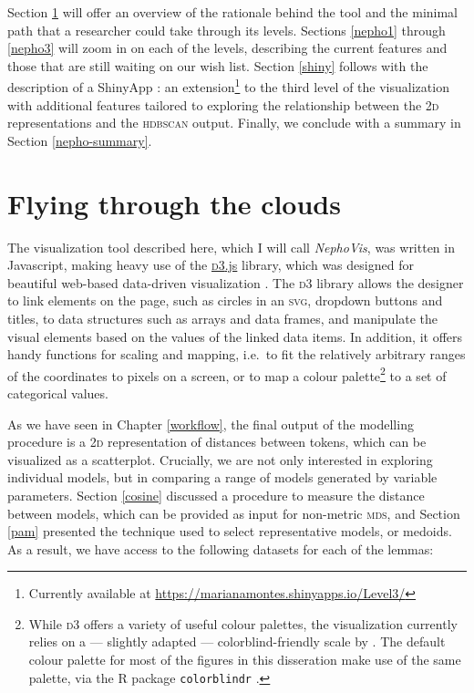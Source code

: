 \documentclass[
]{book}
\begin{document}
Section \ref{nepho-overview} will offer an overview of the rationale behind the tool and the minimal path that a researcher could take through its levels. Sections \ref{nepho1} through \ref{nepho3} will zoom in on each of the levels, describing the current features and those that are still waiting on our wish list. Section \ref{shiny} follows with the description of a ShinyApp \autocite{R-shiny}: an extension\footnote{Currently available at \url{https://marianamontes.shinyapps.io/Level3/}} to the third level of the visualization with additional features tailored to exploring the relationship between the \textsc{2d} representations and the \textsc{hdbscan} output. Finally, we conclude with a summary in Section \ref{nepho-summary}.

\hypertarget{nepho-overview}{%
\section{Flying through the clouds}\label{nepho-overview}}

The visualization tool described here, which I will call \emph{NephoVis}, was written in Javascript, making heavy use of the \href{https://d3.js}{\textsc{d3}.js} library, which was designed for beautiful web-based data-driven visualization \autocite{bostock.etal_2011}. The \textsc{d3} library allows the designer to link elements on the page, such as circles in an \textsc{svg}, dropdown buttons and titles, to data structures such as arrays and data frames, and manipulate the visual elements based on the values of the linked data items. In addition, it offers handy functions for scaling and mapping, i.e.~to fit the relatively arbitrary ranges of the coordinates to pixels on a screen, or to map a colour palette\footnote{While \textsc{d3} offers a variety of useful colour palettes, the visualization currently relies on a --- slightly adapted --- colorblind-friendly scale by \textcite{okabe.ito_2002}. The default colour palette for most of the figures in this disseration make use of the same palette, via the R package \texttt{colorblindr} \autocite{R-colorblindr}.} to a set of categorical values.

As we have seen in Chapter \ref{workflow}, the final output of the modelling procedure is a \textsc{2d} representation of distances between tokens, which can be visualized as a scatterplot. Crucially, we are not only interested in exploring individual models, but in comparing a range of models generated by variable parameters. Section \ref{cosine} discussed a procedure to measure the distance between models, which can be provided as input for non-metric \textsc{mds}, and Section \ref{pam} presented the technique used to select representative models, or medoids. As a result, we have access to the following datasets for each of the lemmas:
\end{document}
